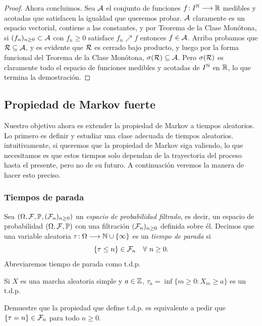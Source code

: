 \begin{proof}
Ahora concluimos.
Sea ${\cal A}$ el conjunto de funciones $f\!:I^{\mathbb{N}}\longrightarrow\mathbb{R}$ medibles y acotadas que satisfacen la igualdad que queremos probar.
${\cal A}$ claramente es un espacio vectorial, contiene a las constantes, y por Teorema de la Clase Monótona, si $(f_n)_{n\geq0}\subset{\cal A}$ con $f_n\geq0$ satisface $f_n\nearrow f$ entonces $f\in{\cal A}$.
Arriba probamos que ${\cal R}\subseteq{\cal A}$, y es evidente que ${\cal R}$ es cerrado bajo producto, y luego por la forma funcional del Teorema de la Clase Monótona, $\sigma({\cal R})\subseteq{\cal A}$.
Pero $\sigma({\cal R})$ es claramente todo el espacio de funciones medibles y acotadas de $I^{\mathbb{N}}$ en $\mathbb{R}$, lo que termina la demostración.
\end{proof}

\subsection{Propiedad de Markov fuerte}

Nuestro objetivo ahora es extender la propiedad de Markov a tiempos aleatorios.
Lo primero es definir y estudiar una clase adecuada de tiempos aleatorios.
intuitivamente, si queremos que la propiedad de Markov siga valiendo, lo que necesitamos es que estos tiempos solo dependan de la trayectoria del proceso hasta el presente, pero no de su futuro.
A continuación veremos la manera de hacer esto preciso.

\subsubsection{Tiempos de parada}

\begin{defn} 
Sea $(\Omega,\mathcal{F},\mathbb{P},(\mathcal{F}_n)_{n\geq0})$ un \emph{espacio de probabilidad filtrado}, es decir, un espacio de probabilidad $(\Omega,\mathcal{F},\mathbb{P})$ con una filtración $(\mathcal{F}_n)_{n\geq0}$ definida sobre él.
Decimos que una variable aleatoria $\tau\!:\Omega\longrightarrow\mathbb{N}\cup\{\infty\}$ es un \emph{tiempo de parada} si
\[\{\tau\leq n\}\in\mathcal{F}_n\quad\forall~n\geq0.\]
Abreviaremos tiempo de parada como t.d.p.
\end{defn}

\begin{ex}\label{ex:taua}
Si $X$ es una marcha aleatoria simple y $a\in\mathbb{Z}$, $\tau_a=\inf\{m\geq0\!:X_m\geq a\}$ es un t.d.p.
\end{ex}

\begin{exer}
Demuestre que la propiedad que define t.d.p. es equivalente a pedir que $\{\tau=n\}\in\mathcal{F}_n$ para todo $n\geq0$.
\end{exer}

